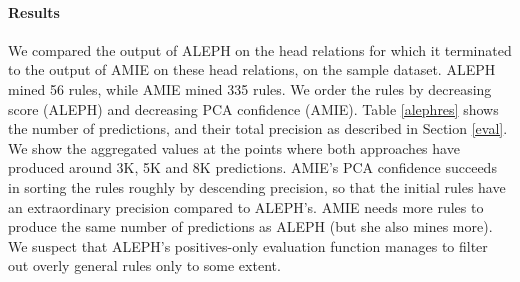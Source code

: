 \paragraph{Results} 
We compared the output of ALEPH on the head relations for which it terminated to the output of AMIE on these head relations, on the sample dataset. 
ALEPH mined 56 rules, while AMIE mined 335 rules. We order the rules by decreasing score (ALEPH) and decreasing PCA confidence (AMIE). Table \ref{alephres} shows the number of predictions, and their total precision as described in Section \ref{eval}. 
We show the aggregated values at the points where both approaches have produced around 3K, 5K and 8K predictions.
AMIE's PCA confidence succeeds in sorting the rules roughly by descending precision, so that the initial rules have an extraordinary precision compared to ALEPH's. AMIE needs more rules to produce the same number of predictions as ALEPH (but she also mines more).
We suspect that ALEPH's positives-only evaluation function manages to filter out overly general rules only to some extent. 
